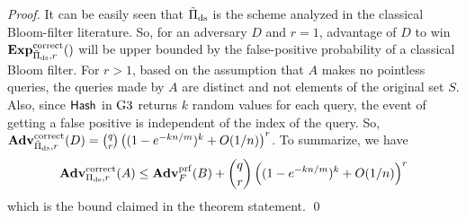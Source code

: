 \begin{proof}
It can be easily seen that $\tilde{\Pi}_{\mathrm{ds}}$ is the
scheme analyzed in the classical Bloom-filter literature. So, for an
adversary $D$ and $r=1$, advantage of $D$ to win
$\ExpCorrect{\tilde{\setprim}_{\mathrm{ds}},r}$ will be upper
bounded by the false-positive probability of a classical Bloom
filter. For $r > 1$, based on the assumption that $A$ makes no
pointless queries, the queries made by $A$ are distinct and not
elements of the original set $S$. Also, since $\mathsf{Hash}$ in
$\text{G3}$ returns $k$ random values for each query, the event of
getting a false positive is independent of the index of the query.
So, $\mathrm{\mathbf{Adv}}^{\mathrm{correct}}_{\tilde{\Pi}_{\mathrm{ds}},r}(D) =
{\binom{q}{r}} \left( (1-e^{-kn/m})^k + O(1/n) \right)^r$. To
summarize, we have
\[
\mathrm{\mathbf{Adv}}^{\mathrm{correct}}_{\Pi_{\mathrm{ds}},r}(A) \leq  \mathbf{Adv}^{\mathrm{prf}}_{F}(B)  + {\dbinom{q}{r}} \left( (1-e^{-kn/m})^k + O(1/n) \right)^r
\]
which is the bound claimed in the theorem statement. \hfill \qed
\end{proof}
